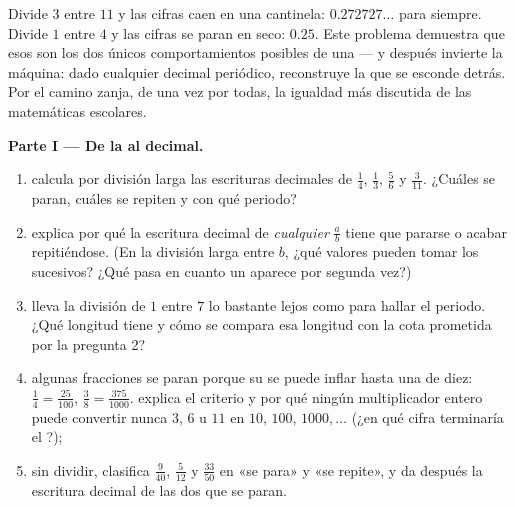 \begin{problem}
\label{pb:g9:fractions:1}
Divide $3$ entre $11$ y las cifras caen en una cantinela:
$0.272727\ldots$ para siempre. Divide $1$ entre $4$ y las cifras se paran
en seco: $0.25$. Este problema demuestra que esos son los dos únicos
comportamientos posibles de una  --- y después invierte la
máquina: dado cualquier decimal periódico, reconstruye la 
que se esconde detrás. Por el camino zanja, de una vez por todas, la
igualdad más discutida de las matemáticas escolares.

\medskip
\noindent\textbf{Parte I --- De la  al decimal.}
\begin{enumerate}
  \item calcula por división larga las escrituras decimales de
        $\frac14$, $\frac13$, $\frac56$ y $\frac{3}{11}$.
        ¿Cuáles se paran, cuáles se repiten y con qué periodo?
  \item explica por qué la escritura decimal de \emph{cualquier} 
        $\frac ab$ tiene que pararse o acabar repitiéndose. (En la
        división larga entre $b$, ¿qué valores pueden tomar los
         sucesivos? ¿Qué pasa en cuanto un 
        aparece por segunda vez?)
  \item lleva la división de $1$ entre $7$ lo bastante lejos como para hallar el
        periodo. ¿Qué longitud tiene y cómo se compara esa longitud
        con la cota prometida por la pregunta 2?
  \item algunas fracciones se paran porque su  se puede
        inflar hasta una  de diez: $\frac14 =
        \frac{25}{100}$, $\frac{3}{8} = \frac{375}{1000}$.
        explica el criterio y por qué ningún multiplicador entero
        puede convertir nunca $3$, $6$ u $11$ en $10$, $100$,
        $1000, \dots$ (¿en qué cifra terminaría el ?);
  \item sin dividir, clasifica $\frac{9}{40}$, $\frac{5}{12}$ y
        $\frac{33}{50}$ en «se para» y «se repite», y da después
        la escritura decimal de las dos que se paran.
\end{enumerate}


\end{problem}
